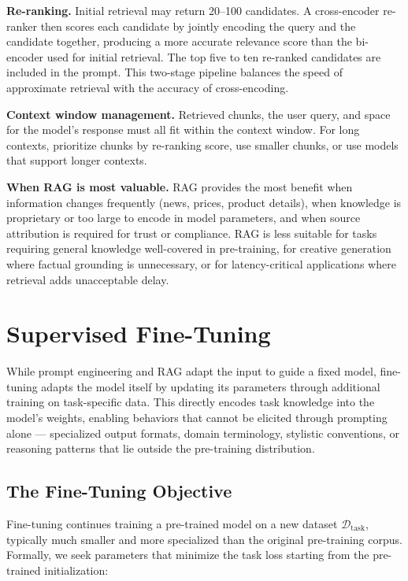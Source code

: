 \documentclass{book}
\begin{document}
\textbf{Re-ranking.} Initial retrieval may return 20--100 candidates.
A cross-encoder re-ranker then scores each candidate by jointly encoding
the query and the candidate together, producing a more accurate relevance
score than the bi-encoder used for initial retrieval. The top five to ten
re-ranked candidates are included in the prompt. This two-stage pipeline
balances the speed of approximate retrieval with the accuracy of
cross-encoding.

\textbf{Context window management.} Retrieved chunks, the user query, and
space for the model's response must all fit within the context window.
For long contexts, prioritize chunks by re-ranking score, use smaller
chunks, or use models that support longer contexts.

\textbf{When RAG is most valuable.} RAG provides the most benefit when
information changes frequently (news, prices, product details), when
knowledge is proprietary or too large to encode in model parameters, and
when source attribution is required for trust or compliance. RAG is less
suitable for tasks requiring general knowledge well-covered in
pre-training, for creative generation where factual grounding is
unnecessary, or for latency-critical applications where retrieval adds
unacceptable delay.

\section{Supervised Fine-Tuning}
\label{sec:sft}

While prompt engineering and RAG adapt the input to guide a fixed model,
fine-tuning adapts the model itself by updating its parameters through
additional training on task-specific data. This directly encodes task
knowledge into the model's weights, enabling behaviors that cannot be
elicited through prompting alone --- specialized output formats, domain
terminology, stylistic conventions, or reasoning patterns that lie outside
the pre-training distribution.

\subsection{The Fine-Tuning Objective}
\label{sec:sft_objective}

Fine-tuning continues training a pre-trained model on a new dataset
$\mathcal{D}_{\text{task}}$, typically much smaller and more specialized
than the original pre-training corpus. Formally, we seek parameters that
minimize the task loss starting from the pre-trained initialization:
\end{document}

